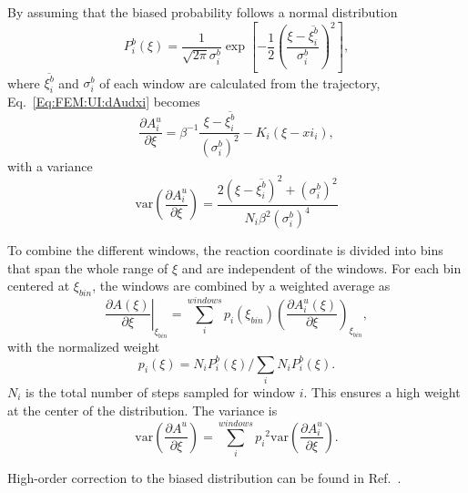 By assuming that the biased probability follows a normal distribution
\begin{equation}
    P_i^b(\xi)=\frac{1}{\sqrt{2\pi}\sigma_i^b}\exp{\left[-\frac{1}{2}\left(\frac{\xi-\overline{\xi_i^b}}{\sigma_i^b}\right)^2\right]},
\end{equation}
where $\overline{\xi_i^b}$ and $\sigma_i^b$ of each window are calculated from the trajectory, Eq.~\ref{Eq:FEM:UI:dAudxi} becomes
\begin{equation}
    \frac{\partial A_i^u}{\partial \xi}=\beta^{-1}\frac{\xi-\overline{\xi_i^b}}{(\sigma_i^b)^2}-K_i(\xi-xi_i),
\end{equation}
with a variance\cite{KaestnerJCP2006}
\begin{equation}
    \mathrm{var}\left(\frac{\partial A_i^u}{\partial \xi}\right)=\frac{2(\xi-\overline{\xi_i^b})^2+(\sigma_i^b)^2}{N_i\beta^2(\sigma_i^b)^4}
\end{equation}

To combine the different windows, the reaction coordinate is divided into bins that span the whole range of $\xi$ and are independent of the windows. For each bin centered at $\xi_{bin}$, the windows are combined by a weighted average as
\begin{equation}
    \left.\frac{\partial A(\xi)}{\partial \xi}\right\vert_{\xi_{bin}}=\sum_{i}^{windows}p_i(\xi_{bin})\left(\frac{\partial A_i^u(\xi)}{\partial \xi}\right)_{\xi_{bin}},
\end{equation}
with the normalized weight
\begin{equation}
    p_i(\xi)=N_iP_i^b(\xi)/\sum_i N_iP_i^b(\xi).
\end{equation}
$N_i$ is the total number of steps sampled for window $i$. This ensures a high weight at the center of the distribution. The variance is
\begin{equation}
    \mathrm{var}\left(\frac{\partial A^u}{\partial \xi}\right)=\sum_{i}^{windows}{p_i}^2\mathrm{var}\left(\frac{\partial A_i^u}{\partial \xi}\right).
\end{equation}

High-order correction to the biased distribution can be found in Ref.~\cite{KaestnerJCP2012}.